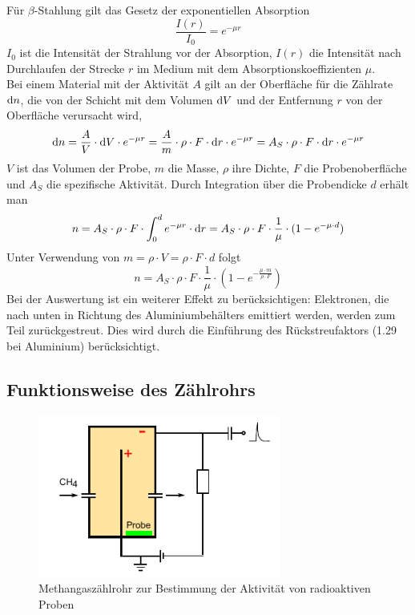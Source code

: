 Für $\beta$-Stahlung gilt das Gesetz der exponentiellen Absorption
\begin{equation}
  \frac{I(r)}{I_0} =e^{-\mu r}
\end{equation}
$I_0$ ist die Intensität der Strahlung vor der Absorption, $I(r)$ die Intensität nach
Durchlaufen der Strecke $r$ im Medium mit dem Absorptionskoeffizienten $\mu$.\\
Bei einem Material mit der Aktivität $A$ gilt an der Oberfläche für die Zählrate $\mathrm{d} n$,
die von der Schicht mit dem Volumen $\mathrm{d} V$ und
der Entfernung $r$ von der Oberfläche verursacht wird,
\begin{equation}
  \mathrm{d} n= \frac{A}{V} \cdot \mathrm{d} V \cdot e^{-\mu r}=
  \frac{A}{m} \cdot \rho \cdot F \cdot \mathrm{d} r \cdot e^{-\mu r}=
  A_S \cdot \rho \cdot F \cdot \mathrm{d} r \cdot e^{-\mu r}
\end{equation}
$V$ ist das Volumen der Probe, $m$ die Masse, $\rho$ ihre Dichte, $F$ die Probenoberfläche und $A_S$
die spezifische Aktivität. Durch Integration über die Probendicke $d$ erhält man
\begin{equation}
  n= A_S \cdot \rho \cdot F \cdot \int_{0}^{d}e^{-\mu r} \cdot \mathrm{d} r=
  A_S \cdot \rho \cdot F \cdot \frac{1}{\mu} \cdot (1-e^{-\mu \cdot d})
\end{equation}
Unter Verwendung von $m=\rho \cdot V= \rho \cdot F \cdot d$ folgt
\begin{equation}
\label{eq:kalium:countrate}
  n= A_S \cdot \rho \cdot F \cdot \frac{1}{\mu} \cdot (1-e^{-\frac{\mu \cdot m}{\rho \cdot F}})
\end{equation}
Bei der Auswertung ist ein weiterer Effekt zu berücksichtigen:
Elektronen, die nach unten in Richtung des Aluminiumbehälters emittiert werden,
werden zum Teil zurückgestreut. Dies wird durch die Einführung des Rückstreufaktors
(1.29 bei Aluminium) berücksichtigt.

\subsection{Funktionsweise des Zählrohrs}

\begin{figure}[H]
\begin{center}
  \includegraphics[width=8cm]{../img/aufbau}
  \caption{Methangaszählrohr zur Bestimmung der Aktivität von radioaktiven Proben}
  \label{img:aufbau}
\end{center}
\end{figure}

